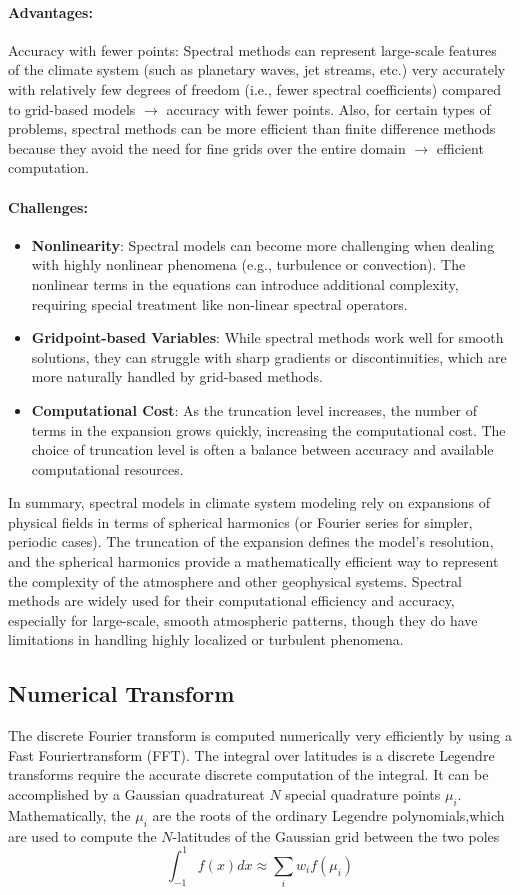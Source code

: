 \paragraph{\textbf{Advantages}:}
Accuracy with fewer points: Spectral methods can represent large-scale features of the climate system (such as planetary waves, jet streams, etc.) very accurately with relatively few degrees of freedom (i.e., fewer spectral coefficients) compared to grid-based models $\rightarrow$ accuracy with fewer points. Also, for certain types of problems, spectral methods can be more efficient than finite difference methods because they avoid the need for fine grids over the entire domain $\rightarrow$ efficient computation.
\paragraph{\textbf{Challenges}:}

\begin{itemize}
	\item \textbf{Nonlinearity}: Spectral models can become more challenging when dealing with highly nonlinear phenomena (e.g., turbulence or convection). The nonlinear terms in the equations can introduce additional complexity, requiring special treatment like non-linear spectral operators.
	\item \textbf{Gridpoint-based Variables}: While spectral methods work well for smooth solutions, they can struggle with sharp gradients or discontinuities, which are more naturally handled by grid-based methods.
	\item \textbf{Computational Cost}: As the truncation level increases, the number of terms in the expansion grows quickly, increasing the computational cost. The choice of truncation level is often a balance between accuracy and available computational resources.
\end{itemize}
In summary, spectral models in climate system modeling rely on expansions of physical fields in terms of spherical harmonics (or Fourier series for simpler, periodic cases). The truncation of the expansion defines the model's resolution, and the spherical harmonics provide a mathematically efficient way to represent the complexity of the atmosphere and other geophysical systems. Spectral methods are widely used for their computational efficiency and accuracy, especially for large-scale, smooth atmospheric patterns, though they do have limitations in handling highly localized or turbulent phenomena.

\subsection{Numerical Transform}
The discrete Fourier transform is computed numerically very efficiently by using a Fast Fouriertransform (FFT).
The integral over latitudes is a discrete Legendre transforms require the accurate discrete computation of the integral. It can be accomplished by a Gaussian
quadratureat $N$ special quadrature points $\mu_i$. Mathematically, the $\mu_i$ are the roots of the ordinary Legendre polynomials,which are used to compute the $N$-latitudes of the Gaussian grid between the two poles
$$\int_{-1}^1 f(x)dx\approx\displaystyle\sum_iw_if(\mu_i)$$

